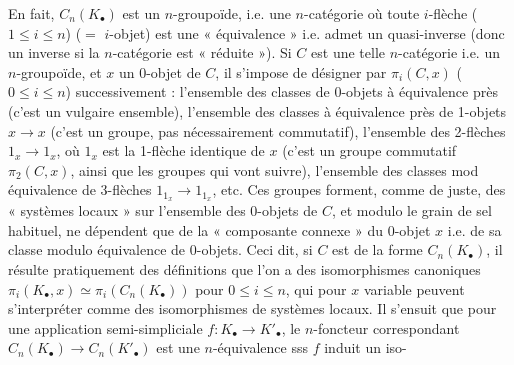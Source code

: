 \documentclass[11pt,a4paper]{article}
\begin{document}
En fait, $C_n(K_\bullet)$ est un $n$-groupoïde, i.e. une $n$-catégorie où toute $i$-flèche ($1 \leqslant i \leqslant n$) ($=$ $i$-objet) est une « équivalence » i.e. admet un quasi-inverse (donc un inverse si la $n$-catégorie est « réduite »). Si $C$ est une telle $n$-catégorie i.e. un $n$-groupoïde, et $x$ un 0-objet de $C$, il s'impose de désigner par $\pi_i(C, x)$ ($0 \leqslant i \leqslant n$) successivement : l'ensemble des classes de 0-objets à équivalence près (c'est un vulgaire ensemble), l'ensemble des classes à équivalence près de 1-objets  $x \to x$ (c'est un groupe, pas nécessairement commutatif), l'ensemble des  2-flèches $1_x \to 1_x$, où $1_x$ est la 1-flèche identique de $x$ (c'est un groupe commutatif $\pi_2(C, x)$, ainsi que les groupes qui vont suivre), l'ensemble des classes mod équivalence de 3-flèches $1_{1_x} \to 1_{1_x}$, etc. Ces groupes forment, comme de juste, des « systèmes locaux » sur l'ensemble des 0-objets de $C$, et modulo le grain de sel habituel,  ne dépendent que de la « composante connexe » du 0-objet $x$ i.e. de sa classe modulo équivalence de 0-objets. Ceci dit, si $C$ est de la forme $C_n(K_\bullet)$, il résulte pratiquement des définitions que l'on a des isomorphismes canoniques $\pi_i(K_\bullet, x) \simeq \pi_i(C_n(K_\bullet))$ pour $0 \leqslant i \leqslant n$, qui pour $x$ variable peuvent s'interpréter comme des isomorphismes de systèmes locaux. Il s'ensuit que pour une application semi-simpliciale $f\colon K_\bullet \to K'_\bullet$, le $n$-foncteur correspondant $C_n(K_\bullet) \to C_n(K'_\bullet)$ est une $n$-équivalence sss $f$ induit un iso-
\end{document}
